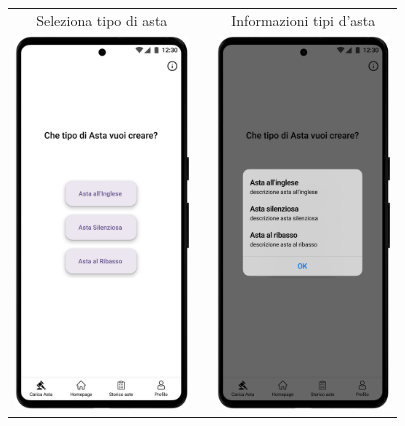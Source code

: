 \begin{center}
	\begin{tabular}{ccc}
		Seleziona tipo di asta                                           &  &
		Informazioni tipi d'asta                                                        \\
		\includegraphics[height=280pt]{assets/mockup/Carica Asta 1..png} &  &
		\includegraphics[height=280pt]{assets/mockup/Carica Asta 1. - informazioni.png} \\
	\end{tabular}
\end{center}
